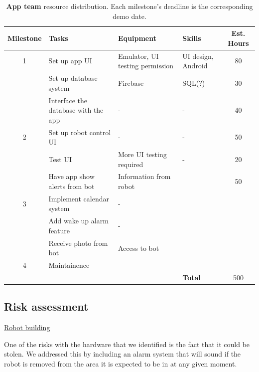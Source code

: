\documentclass{article}
\begin{document}
\begin{table}[]
  \begin{center}
  \begin{small}
  \begin{tabular}{|c|l|l|l|c|}
    \hline
    {\bf Milestone} & {\bf Tasks} & {\bf Equipment} & {\bf Skills} & {\bf Est. Hours} \\ \hline
    1               & Set up app UI & Emulator, UI testing permission & UI design, Android & 80 \\ \cline{2-5}
                    & Set up database system & Firebase & SQL(?) & 30 \\ \cline{2-5}
                    & Interface the database with the app & - & - & 40 \\ \hline
    2               & Set up robot control UI & - & - & 50 \\ \cline{2-5}
                    & Test UI & More UI testing required & - & 20 \\ \cline{2-5}
                    & Have app show alerts from bot & Information from robot &  & 50 \\ \hline
    3               & Implement calendar system & - &  &  \\ \cline{2-5}
                    & Add wake up alarm feature & - &  &  \\ \cline{2-5}
                    & Receive photo from bot & Access to bot &  &  \\ \hline
    4               & Maintainence &  &  &  \\ \hline
                    &                           &  & {\bf Total} & 500 \\ \hline
  \end{tabular}
  \end{small}
  \caption{{\bf App team} resource distribution. Each milestone's deadline is the corresponding demo date.}
  \end{center}
\end{table}

\subsection{Risk assessment} 

\underline{Robot building}

One of the risks with the hardware that we identified is the fact that it could be stolen. We addressed this by including an alarm system that will sound if the robot is removed from the area it is expected to be in at any given moment.
\end{document}

